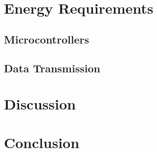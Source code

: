 \chapter{Energy Requirements}
  \label{chap:energyRequirements}
  
  \section{Microcontrollers}
      
  
  \section{Data Transmission}
      

\chapter{Discussion}

\chapter{Conclusion}